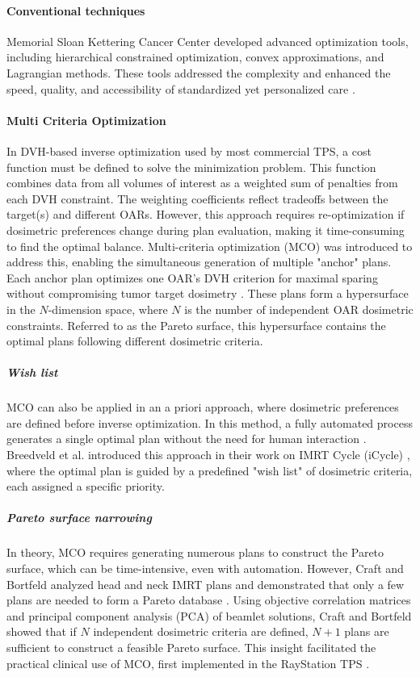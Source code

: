 \paragraph{Conventional techniques}
Memorial Sloan Kettering Cancer Center developed advanced optimization tools, including hierarchical constrained optimization, convex approximations, and Lagrangian methods.
These tools addressed the complexity and enhanced the speed, quality, and accessibility of standardized yet personalized care \cite{Zarepisheh2022}.

\paragraph{Multi Criteria Optimization}
In DVH-based inverse optimization used by most commercial TPS, a cost function must be defined to solve the minimization problem.
This function combines data from all volumes of interest as a weighted sum of penalties from each DVH constraint.
The weighting coefficients reflect tradeoffs between the target(s) and different OARs.
However, this approach requires re-optimization if dosimetric preferences change during plan evaluation, making it time-consuming to find the optimal balance.
Multi-criteria optimization (MCO) was introduced to address this, enabling the simultaneous generation of multiple "anchor" plans.
Each anchor plan optimizes one OAR's DVH criterion for maximal sparing without compromising tumor target dosimetry \cite{lahanas2003,thieke2007}.
These plans form a hypersurface in the $N$-dimension space, where $N$ is the number of independent OAR dosimetric constraints.
Referred to as the Pareto surface, this hypersurface contains the optimal plans following different dosimetric criteria.

\subparagraph{Wish list}
MCO can also be applied in an a priori approach, where dosimetric preferences are defined before inverse optimization.
In this method, a fully automated process generates a single optimal plan without the need for human interaction \cite{breedveld2007}.
Breedveld et al. introduced this approach in their work on IMRT Cycle (iCycle) \cite{iCycle}, where the optimal plan is guided by a predefined "wish list" of dosimetric criteria, each assigned a specific priority.

\subparagraph{Pareto surface narrowing}
In theory, MCO requires generating numerous plans to construct the Pareto surface, which can be time-intensive, even with automation.
However, Craft and Bortfeld analyzed head and neck IMRT plans and demonstrated that only a few plans are needed to form a Pareto database \cite{craft2008}.
Using objective correlation matrices and principal component analysis (PCA) of beamlet solutions, Craft and Bortfeld showed that if $N$ independent dosimetric criteria are defined, $N + 1$ plans are sufficient to construct a feasible Pareto surface.
This insight facilitated the practical clinical use of MCO, first implemented in the RayStation TPS \cite{RayStationTPS}.

